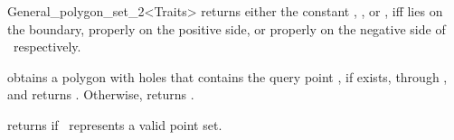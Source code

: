 \begin{ccRefClass}{General_polygon_set_2<Traits>}
  {returns either the constant , 
   , or , iff  lies on 
   the boundary, properly on the positive side, or properly on the negative 
   side of \ccVar\ respectively.}

  {obtains a polygon with holes that contains the query point , 
   if exists, through , and returns . 
   Otherwise, returns .}


  {returns  if \ccVar\ represents a valid point set.}

\ccSeeAlso
  \\
  \\

\end{ccRefClass}

\ccRefPageEnd

